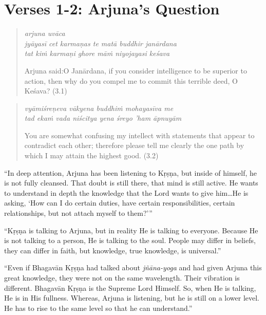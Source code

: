 \documentclass[12pt, twoside, openright]{memoir}
\begin{document}
\section{Verses 1-2: Arjuna's Question}\label{sec-verses-1-2-arjuna-s-question}

\par
\begin{verse}
\textit{arjuna uvāca} \\
\textit{jyāyasī cet karmaṇas te matā buddhir janārdana} \\
\textit{tat kiṁ karmaṇi ghore māṁ niyojayasi keśava}

\noindent \quad Arjuna said:\linebreak O Janārdana, if you consider intelligence to be superior to action, then why do you compel me to commit this terrible deed, O Keśava? (3.1)
\end{verse}
\par



\par
\begin{verse}
\textit{vyāmiśreṇeva vākyena buddhiṁ mohayasīva me} \\
\textit{tad ekaṁ vada niścitya yena śreyo ’ham āpnuyām}

\noindent You are somewhat confusing my intellect with statements that appear to contradict each other; therefore please tell me clearly the one path by which I may attain the highest good. (3.2)
\end{verse}
\par



\enquote{In deep attention, Arjuna has been listening to Kṛṣṇa, but inside of himself, he is not fully cleansed. That doubt is still there, that mind is still active. He wants to understand in depth the knowledge that the Lord wants to give him\ldots He is asking, \enquote{How can I do certain duties, have certain responsibilities, certain relationships, but not attach myself to them?}}

\enquote{Kṛṣṇa is talking to Arjuna, but in reality He is talking to everyone. Because He is not talking to a person, He is talking to the soul. People may differ in beliefs, they can differ in faith, but knowledge, true knowledge, is universal.}

\enquote{Even if Bhagavān Kṛṣṇa had talked about \textit{jñāna-yoga} and had given Arjuna this great knowledge, they were not on the same wavelength. Their vibration is different. Bhagavān Kṛṣṇa is the Supreme Lord Himself. So, when He is talking, He is in His fullness. Whereas, Arjuna is listening, but he is still on a lower level. He has to rise to the same level so that he can understand.}
\end{document}
